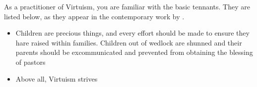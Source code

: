 \documentclass[blue]{guildcamp1}
\begin{document}
\name{\bVirtuism{}}

As a practitioner of Virtuism, you are familiar with the basic tennants. They are listed below, as they appear in the contemporary work by \cPastor{\MYname{}}.

\begin{itemize}
  \item Children are precious things, and every effort should be made to ensure they hare raised within families. Children out of wedlock are shunned and their parents should be excommunicated and prevented from obtaining the blessing of pastors
  \item Above all, Virtuism strives 
\end{itemize}
\end{document}
